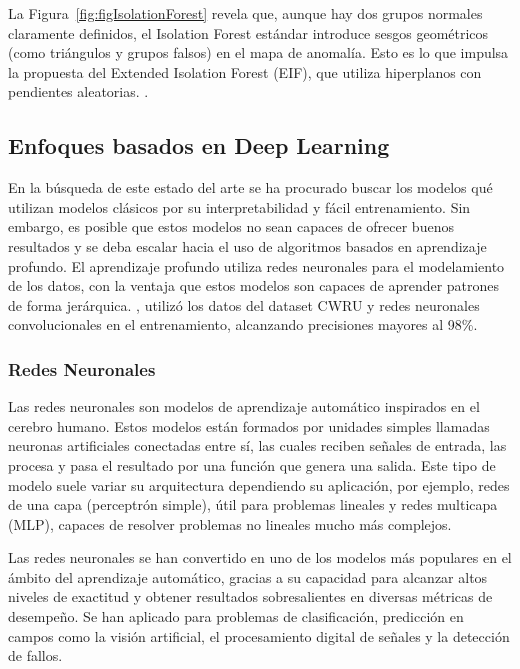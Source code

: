 \documentclass[11pt,a4paper,spanish]{book}
\numberwithin{equation}{chapter}
\numberwithin{figure}{chapter}
\begin{document}
La Figura~\ref{fig:figIsolationForest} revela que, aunque hay dos grupos normales 
claramente definidos, el Isolation Forest estándar introduce sesgos geométricos 
(como triángulos y grupos falsos) en el mapa de anomalía. Esto es lo que impulsa la 
propuesta del Extended Isolation Forest (EIF), que utiliza hiperplanos con pendientes 
aleatorias. \cite{liu2021isoletionforest}.


\subsection{Enfoques basados en Deep Learning}

En la búsqueda de este estado del arte se ha procurado buscar los modelos qué utilizan 
modelos clásicos por su interpretabilidad y fácil entrenamiento. Sin embargo, es posible 
que estos modelos no sean capaces de ofrecer buenos resultados y se deba escalar hacia 
el uso de algoritmos basados en aprendizaje profundo. El aprendizaje profundo utiliza 
redes neuronales para el modelamiento de los datos, con la ventaja que estos modelos 
son capaces de aprender patrones de forma jerárquica. \cite{raj2024bearing}, utilizó 
los datos del dataset CWRU y redes neuronales convolucionales en el entrenamiento, 
alcanzando precisiones mayores al 98\%.


\subsubsection{Redes Neuronales}

Las redes neuronales son modelos de aprendizaje automático inspirados en el cerebro 
humano. Estos modelos están formados por unidades simples llamadas neuronas artificiales 
conectadas entre sí, las cuales reciben señales de entrada, las procesa y pasa el 
resultado por una función que genera una salida. Este tipo de modelo suele variar su 
arquitectura dependiendo su aplicación, por ejemplo, redes de una capa 
(perceptrón simple), útil para problemas lineales y redes multicapa (MLP), capaces de 
resolver problemas no lineales mucho más complejos.


Las redes neuronales se han convertido en uno de los modelos más populares en el ámbito 
del aprendizaje automático, gracias a su capacidad para alcanzar altos niveles de 
exactitud y obtener resultados sobresalientes en diversas métricas de desempeño. 
Se han aplicado para problemas de clasificación, predicción en campos como la visión 
artificial, el procesamiento digital de señales y la detección de fallos. 
\end{document}
